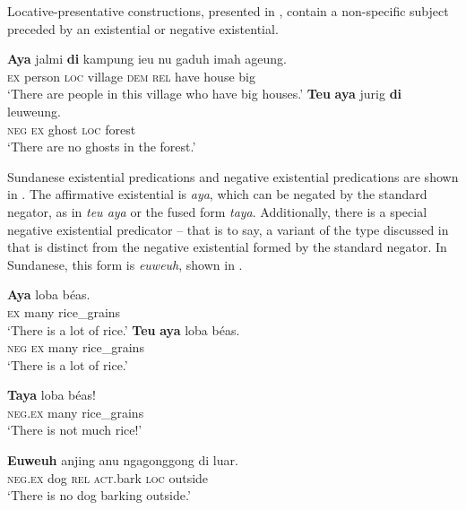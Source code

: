 \documentclass[output=paper]{langscibook}
\begin{document}
Locative-presentative constructions, presented in , contain a non-specific subject preceded by an existential or negative existential. 

 
\ea\label{ex:sun:23}
    \ea\label{ex:sun:23a}
        \gll  \textbf{Aya} jalmi \textbf{di} kampung ieu nu gaduh imah ageung.\\ 
              \textsc{ex} person \textsc{loc} village \textsc{dem} \textsc{rel} have house big\\
        \glt ‘There are people in this village who have big houses.’
    \ex\label{ex:sun:23b}
        \gll  \textbf{Teu} \textbf{aya} jurig \textbf{di} leuweung.\\
              \textsc{neg} \textsc{ex} ghost \textsc{loc} forest\\
        \glt ‘There are no ghosts in the forest.’
    \z
\z 

 Sundanese existential predications and negative existential predications are shown in . The affirmative existential is \textit{aya}, which can be negated by the standard negator, as in \textit{teu aya} or the fused form \textit{taya}. Additionally, there is a special negative existential predicator – that is to say, a variant of the type discussed in \citet{Veselinova2013neg.exist} that is distinct from the negative existential formed by the standard negator. In Sundanese, this form is \textit{euweuh}, shown in . 

 \ea\label{ex:sun:24}
    \ea\label{ex:sun:24a}
        \gll  \textbf{Aya} loba béas.\\ 
              \textsc{ex} many rice\_grains\\
        \glt ‘There is a lot of rice.’
    \ex\label{ex:sun:24b}
        \gll  \textbf{Teu} \textbf{aya} loba béas.
\\
              \textsc{neg} \textsc{ex} many rice\_grains\\
        \glt ‘There is a lot of rice.’

    \ex\label{ex:sun:24c}
        \gll  \textbf{Taya} loba béas!\\
              \textsc{neg}.\textsc{ex} many rice\_grains\\
        \glt ‘There is not much rice!’

    \ex\label{ex:sun:24d}
        \gll  \textbf{Euweuh} anjing anu ngagonggong di luar.\\
              \textsc{neg}.\textsc{ex} dog \textsc{rel} \textsc{act}.bark \textsc{loc} outside\\
        \glt ‘There is no dog barking outside.’ \citep[109]{Butters2021}
    \z
\z 
\end{document}
